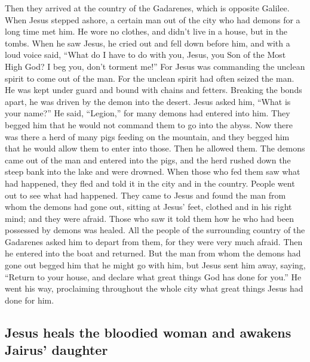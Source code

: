 \begin{paracol}{2}
\begin{otherlanguage}{english}
 Then they arrived at the country of the Gadarenes, which
is opposite Galilee.  When Jesus stepped ashore, a
certain man out of the city who had demons for a long time met him. He
wore no clothes, and didn't live in a house, but in the tombs.
 When he saw Jesus, he cried out and fell down before
him, and with a loud voice said, ``What do I have to do with you, Jesus,
you Son of the Most High God? I beg you, don't torment me!''
 For Jesus was commanding the unclean spirit to come out
of the man. For the unclean spirit had often seized the man. He was kept
under guard and bound with chains and fetters. Breaking the bonds apart,
he was driven by the demon into the desert.  Jesus asked
him, ``What is your name?'' He said, ``Legion,'' for many demons had
entered into him.  They begged him that he would not
command them to go into the abyss.  Now there was there a
herd of many pigs feeding on the mountain, and they begged him that he
would allow them to enter into those. Then he allowed them.
 The demons came out of the man and entered into the
pigs, and the herd rushed down the steep bank into the lake and were
drowned.  When those who fed them saw what had happened,
they fled and told it in the city and in the country. 
People went out to see what had happened. They came to Jesus and found
the man from whom the demons had gone out, sitting at Jesus' feet,
clothed and in his right mind; and they were afraid. 
Those who saw it told them how he who had been possessed by demons was
healed.  All the people of the surrounding country of the
Gadarenes asked him to depart from them, for they were very much afraid.
Then he entered into the boat and returned.  But the man
from whom the demons had gone out begged him that he might go with him,
but Jesus sent him away, saying,  ``Return to your house,
and declare what great things God has done for you.'' He went his way,
proclaiming throughout the whole city what great things Jesus had done
for him.

\hypertarget{jesus-heals-the-bloodied-woman-and-awakens-jairus-daughter}{%
\subsection{Jesus heals the bloodied woman and awakens Jairus'
daughter}\label{jesus-heals-the-bloodied-woman-and-awakens-jairus-daughter}}


\end{otherlanguage}
\end{paracol}
